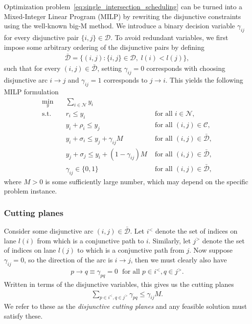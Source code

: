 \documentclass[a4paper]{article}
\theoremstyle{definition}
\theoremstyle{plain}
\begin{document}
Optimization problem~\ref{eq:single_intersection_scheduling} can be turned into
a Mixed-Integer Linear Program (MILP) by rewriting the disjunctive constraints using
the well-known big-M method.
%
We introduce a binary decision variable $\gamma_{ij}$ for every
disjunctive pair $\{i, j\} \in \mathcal{D}$.
%
To avoid redundant variables, we first impose some arbitrary ordering of the
disjunctive pairs by defining
\begin{align*}
  \bar{\mathcal{D}} = \{ (i,j) : \{i,j\} \in \mathcal{D}, \; l(i) < l(j) \} ,
\end{align*}
such that for every $(i,j) \in \bar{\mathcal{D}}$, setting $\gamma_{ij} = 0$
corresponds with choosing disjunctive arc $i \rightarrow j$ and
$\gamma_{ij} = 1$ corresponds to $j \rightarrow i$. This yields the following
MILP formulation
%
\begin{align*}
  \min_{y} \quad & \sum_{i \in \mathcal{N}} y_{i} & \\
  \text{s.t.} \quad & r_{i} \leq y_{i} & \text{ for all } i \in \mathcal{N} , \\
  & y_{i} + \rho_{i} \leq y_{j} & \text{ for all } (i,j) \in \mathcal{C} , \label{eq:conjunctions} \\
  & y_{i} + \sigma_{i} \leq y_{j} + \gamma_{ij}M & \text{ for all } (i,j) \in \bar{\mathcal{D}} , \\
  & y_{j} + \sigma_{j} \leq y_{i} + (1 - \gamma_{ij})M & \text{ for all } (i,j) \in \bar{\mathcal{D}} , \\
  & \gamma_{ij} \in \{0, 1\} & \text{ for all } (i,j) \in \bar{\mathcal{D}} ,
\end{align*}
where $M > 0$ is some sufficiently large number, which may depend on the
specific problem instance.

\subsubsection*{Cutting planes}

Consider some disjunctive arc $(i,j) \in \bar{\mathcal{D}}$. Let $i^{<}$ denote
the set of indices on lane $l(i)$ from which is a conjunctive path to $i$.
Similarly, let $j^{>}$ denote the set of indices on lane $l(j)$ to which is a
conjunctive path from $j$.
%
Now suppose $\gamma_{ij} = 0$, so the direction of the arc is $i \rightarrow j$,
then we must clearly also have
\begin{align*}
  p \rightarrow q \equiv \gamma_{pq} = 0 \; \text{ for all } p \in i^{<}, q \in j^{>} .
\end{align*}
Written in terms of the disjunctive variables, this gives us the cutting planes
\begin{align*}
  \sum_{p \in i^{<}, q \in j^{>}} \gamma_{pq} \leq \gamma_{ij} M .
\end{align*}
We refer to these as the \textit{disjunctive cutting planes} and any feasible
solution must satisfy these.
\end{document}
